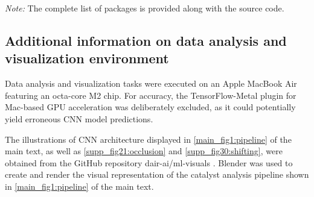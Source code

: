 \documentclass[a4paper, 12pt]{article}
\begin{document}
\begin{table}[htbp]
  \smallskip

  \begin{flushright}
  \begin{minipage}{\textwidth}
    \footnotesize\textit{Note:} The complete list of packages is
      provided along with the source code.
  \end{minipage}
  \end{flushright}
\end{table}

\subsection{Additional information on data analysis and visualization environment}
\label{supp_sec4.2_vis_env}

Data analysis and visualization tasks were executed on an Apple MacBook Air featuring an octa-core M2 chip.
For accuracy, the TensorFlow-Metal plugin for Mac-based GPU acceleration was deliberately excluded,
as it could potentially yield erroneous CNN model predictions.

The illustrations of CNN architecture displayed in \cref{main_fig1:pipeline} of the main text,
as well as \cref{supp_fig21:occlusion} and \cref{supp_fig30:shifting},
were obtained from the GitHub repository dair-ai/ml-visuals \cite{Saravia_ML_Visuals_2021}.
Blender was used to create and render the visual representation of the
catalyst analysis pipeline shown in \cref{main_fig1:pipeline} of the main text.
\end{document}
